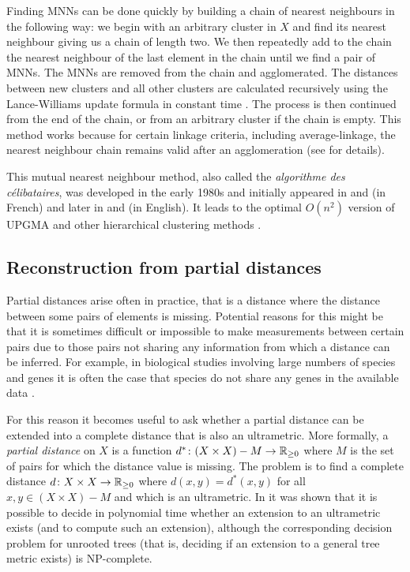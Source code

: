 Finding MNNs can be done quickly by building a chain of nearest neighbours in
the following way: we begin with an arbitrary cluster in $X$ and find its
nearest neighbour giving us a chain of length two.  We then repeatedly add to
the chain the nearest neighbour of the last element in the chain until we find
a pair of MNNs.  The MNNs are removed from the chain and agglomerated.  The
distances between new clusters and all other clusters are calculated
recursively using the Lance-Williams update formula in constant time
\cite{lance66theory}.  The process is then continued from the end of the
chain, or from an arbitrary cluster if the chain is empty.  This method works
because for certain linkage criteria, including average-linkage, the nearest
neighbour chain remains valid after an agglomeration (see
\cite{gronau2007optimal} for details).

This mutual nearest neighbour method, also called the \textit{algorithme des
  célibataires}, was developed in the early 1980s and initially appeared in
\cite{de1980classification} and \cite{juan1982programme} (in French) and later
in \cite{murtagh1983survey} and \cite{murtagh1984complexities} (in English).
It leads to the optimal $O(n^2)$ version of UPGMA and other hierarchical
clustering methods \cite{gronau2007optimal}.

\subsection{Reconstruction from partial distances}
\label{sec:constr-from-part}

Partial distances arise often in practice, that is a distance where the
distance between some pairs of elements is missing.  Potential reasons for
this might be that it is sometimes difficult or impossible to make
measurements between certain pairs due to those pairs not sharing any
information from which a distance can be inferred.  For example, in biological
studies involving large numbers of species and genes it is often the case that
species do not share any genes in the available data
\cite{criscuolo2008fastnj}.

For this reason it becomes useful to ask whether a partial distance can be
extended into a complete distance that is also an ultrametric.  More formally,
a \textit{partial distance} on $X$ is a function $d^* \colon (X \times X) - M
\to {\mathbb R}_{\geq 0}$ where $M$ is the set of pairs for which the distance value is
missing.  The problem is to find a complete distance $d \colon X \times X \to
{\mathbb R}_{\geq 0}$ where $d(x,y) = d^*(x,y)$ for all $x,y \in (X \times X) - M$ and which
is an ultrametric.  In \cite{farach1995robust} it was shown that it is
possible to decide in polynomial time whether an extension to an ultrametric
exists (and to compute such an extension), although the corresponding decision
problem for unrooted trees (that is, deciding if an extension to a general
tree metric exists) is NP-complete.

